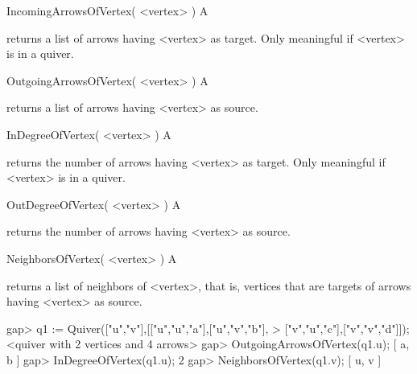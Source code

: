 \>IncomingArrowsOfVertex( <vertex> ) A

returns a list of arrows having <vertex> as target.
Only meaningful if <vertex> is in a quiver.

\>OutgoingArrowsOfVertex( <vertex> ) A

returns a list of arrows having <vertex> as source.

\>InDegreeOfVertex( <vertex> ) A

returns the number of arrows having <vertex> as target.
Only meaningful if <vertex> is in a quiver.

\>OutDegreeOfVertex( <vertex> ) A

returns the number of arrows having <vertex> as source.

\>NeighborsOfVertex( <vertex> ) A

returns a list of neighbors of <vertex>,
that is,
vertices that are targets of arrows having <vertex> as source.

\beginexample
gap> q1 := Quiver(["u","v"],[["u","u","a"],["u","v","b"],
> ["v","u","c"],["v","v","d"]]);
<quiver with 2 vertices and 4 arrows>
gap> OutgoingArrowsOfVertex(q1.u);
[ a, b ]
gap> InDegreeOfVertex(q1.u);
2
gap> NeighborsOfVertex(q1.v);
[ u, v ]
\endexample




